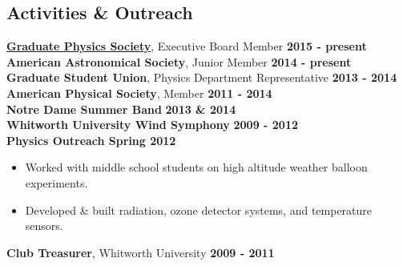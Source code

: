 \documentclass[margin]{res}
\begin{document}
\begin{resume}
\section{Activities \& Outreach}
{\bf \href{www.nd.edu/~gps}{Graduate Physics Society}}, Executive Board Member \hfill {\bf 2015 - present }\\
{\bf American Astronomical Society}, Junior Member  \hfill {\bf 2014 - present }\\
{\bf Graduate Student Union}, Physics Department Representative  \hfill {\bf 2013 - 2014 }\\
{\bf American Physical Society}, Member  \hfill {\bf 2011 - 2014 }\\
{\bf Notre Dame Summer Band} \hfill {\bf 2013 \&  2014 }\\
{\bf Whitworth University Wind Symphony}  \hfill {\bf 2009 - 2012 }\\
{\bf Physics Outreach \hfill  Spring 2012}
\begin{itemize}\itemsep -2pt
\item Worked with middle school students on high altitude weather balloon experiments.
\item Developed \& built radiation, ozone detector systems, and temperature sensors.
\end{itemize}
\vspace{-10pt}
{\bf Club Treasurer}, Whitworth University \hfill {\bf2009 - 2011}









\end{resume}
\end{document}
